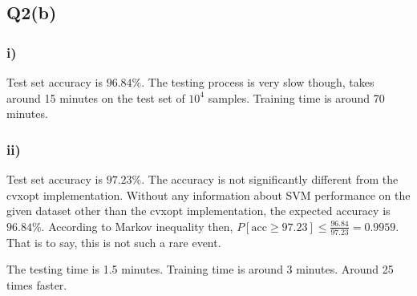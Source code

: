 \documentclass[11pt]{article}
\begin{document}
\subsection{Q2(b)}
\label{sec:org26d97bb}
\subsubsection{i)}
\label{sec:org2c05647}
Test set accuracy is \(96.84\%\). The testing process is very slow
though, takes around 15 minutes on the test set of \(10^4\)
samples. Training time is around 70 minutes.

\subsubsection{ii)}
\label{sec:orgf28d3ee}
Test set accuracy is \(97.23\%\). The accuracy is not significantly
different from the cvxopt implementation. Without any information
about SVM performance on the given dataset other than the cvxopt
implementation, the expected accuracy is \(96.84\%\). According to
Markov inequality then, \(\displaystyle P[\text{acc}\ge 97.23]\le
\frac{96.84}{97.23}=0.9959\). That is to say, this is not such a rare event.

\par The testing time is 1.5 minutes. Training time is around 3
minutes. Around 25 times faster.
\end{document}
